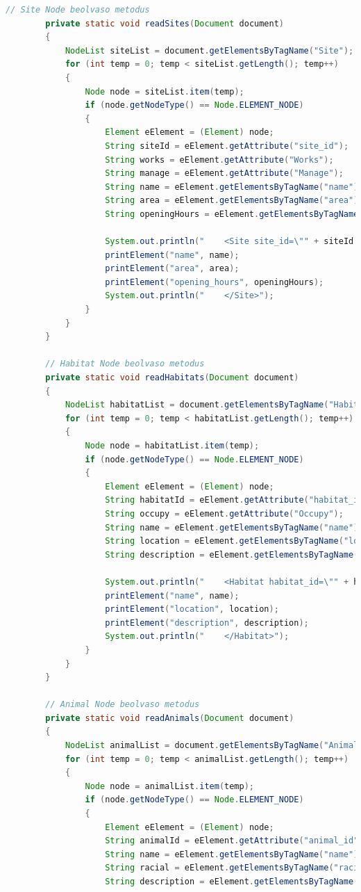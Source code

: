 \documentclass[12pt]{report}
\begin{document}
\begin{lstlisting}[caption={DOMReadKLNSPG.java} adatolvasó program, language=Java]
		// Site Node beolvaso metodus
		private static void readSites(Document document) 
		{
			NodeList siteList = document.getElementsByTagName("Site");
			for (int temp = 0; temp < siteList.getLength(); temp++) 
			{
				Node node = siteList.item(temp);
				if (node.getNodeType() == Node.ELEMENT_NODE) 
				{
					Element eElement = (Element) node;
					String siteId = eElement.getAttribute("site_id");
					String works = eElement.getAttribute("Works");
					String manage = eElement.getAttribute("Manage");
					String name = eElement.getElementsByTagName("name").item(0).getTextContent();
					String area = eElement.getElementsByTagName("area").item(0).getTextContent();
					String openingHours = eElement.getElementsByTagName("opening_hours").item(0).getTextContent();
					
					System.out.println("    <Site site_id=\"" + siteId + "\" Works=\"" + works + "\" Manage=\"" + manage + "\">");
					printElement("name", name);
					printElement("area", area);
					printElement("opening_hours", openingHours);
					System.out.println("    </Site>");
				}
			}
		}
		
		// Habitat Node beolvaso metodus
		private static void readHabitats(Document document) 
		{
			NodeList habitatList = document.getElementsByTagName("Habitat");
			for (int temp = 0; temp < habitatList.getLength(); temp++) 
			{
				Node node = habitatList.item(temp);
				if (node.getNodeType() == Node.ELEMENT_NODE) 
				{
					Element eElement = (Element) node;
					String habitatId = eElement.getAttribute("habitat_id");
					String occupy = eElement.getAttribute("Occupy");
					String name = eElement.getElementsByTagName("name").item(0).getTextContent();
					String location = eElement.getElementsByTagName("location").item(0).getTextContent();
					String description = eElement.getElementsByTagName("description").item(0).getTextContent();
					
					System.out.println("    <Habitat habitat_id=\"" + habitatId + "\" Occupy=\"" + occupy + "\">");
					printElement("name", name);
					printElement("location", location);
					printElement("description", description);
					System.out.println("    </Habitat>");
				}
			}
		}
		
		// Animal Node beolvaso metodus
		private static void readAnimals(Document document) 
		{
			NodeList animalList = document.getElementsByTagName("Animal");
			for (int temp = 0; temp < animalList.getLength(); temp++) 
			{
				Node node = animalList.item(temp);
				if (node.getNodeType() == Node.ELEMENT_NODE) 
				{
					Element eElement = (Element) node;
					String animalId = eElement.getAttribute("animal_id");
					String name = eElement.getElementsByTagName("name").item(0).getTextContent();
					String racial = eElement.getElementsByTagName("racial").item(0).getTextContent();
					String description = eElement.getElementsByTagName("description").item(0).getTextContent();
					

\end{lstlisting}
\end{document}

